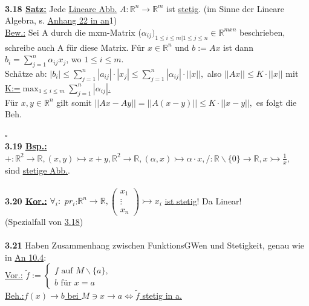 \documentclass[]{scrartcl}
\begin{document}
	\\
	\textbf{3.18 \underline{Satz:}} Jede  \ul{Lineare Abb.} 
	$A:\mathbb{R}^n\rightarrow\mathbb{R}^m$ ist \ul{stetig}. (im Sinne der 
	Lineare Algebra, s. \ul{Anhang 22 in an}1)\\
	\underline{Bew.:} Sei A durch die mxm-Matrix ($\alpha_{ij})_{1\leq i\leq 
	m|1\leq j\leq n}\in\mathbb{R}^{mxn}$ beschrieben, schreibe auch A für diese 
	Matrix. Für $x \in \mathbb{R}^n$ und $b:=Ax$ ist dann 
	$b_i=\sum_{j=1}^{n}\alpha_{ij}x_j$, wo $1\leq i \leq m$.\\
	Schätze ab: \ul{$|b_i|\leq 
	\sum_{j=1}^{n}|a_{ij}|\cdot|x_j|\leq 
	\sum_{j=1}^{n}|\alpha_{ij}|\cdot||x||,$} also \ul{$||Ax||\leq K\cdot||x||$}
	mit \ul{K:=$\max_{1\leq i\leq m}\sum_{j=1}^{n}|\alpha_{ij}|$.}\\
	Für $x,y\in\mathbb{R}^n$ gilt somit $||Ax-Ay||=||A(x-y)||\leq K\cdot 
	||x-y||,$ es folgt die Beh.\\
	\strut\hfill$\square$\\
	\textbf{3.19 \underline{Bsp.:}} $+:\mathbb{R}^2\rightarrow\mathbb{R}, 
	(x,y)\rightarrowtail x+y, \mathbb{R}^2\rightarrow\mathbb{R}, 
	(\alpha,x)\rightarrowtail \alpha\cdot x, 
	/:\mathbb{R}\backslash\{0\}\rightarrow\mathbb{R}, 
	x\rightarrowtail\frac{1}{x},$\\
	sind \ul{stetige Abb.}.\\
	\\
	\textbf{3.20 \underline{Kor.:}} $\forall_i:$ 
	\ul{$pr_i$}:$\mathbb{R}^n\rightarrow\mathbb{R},\begin{pmatrix}
		x_1\\ \vdots\\x_n
	\end{pmatrix}\rightarrowtail x_i$ \ul{ist stetig}! Da Linear!\\
	(Spezialfall von  \ul{3.18})\\
	\\
	\textbf{3.21} Haben Zusammenhang zwischen FunktionsGWen und Stetigkeit, 
	genau wie in \ul{An 10.4}:\\
	\underline{Vor.:} \ul{$\tilde{f}$}$:=\begin{cases}
			f \text{ auf } M\backslash \{a\},\\
			b \text{ für } x=a
	\end{cases}$\\
\underline{Beh.:}\ul{$f(x)\rightarrow b$ bei $M\ni x\rightarrow a 
\Leftrightarrow \tilde{f}$ stetig in a.}\\
\end{document}
